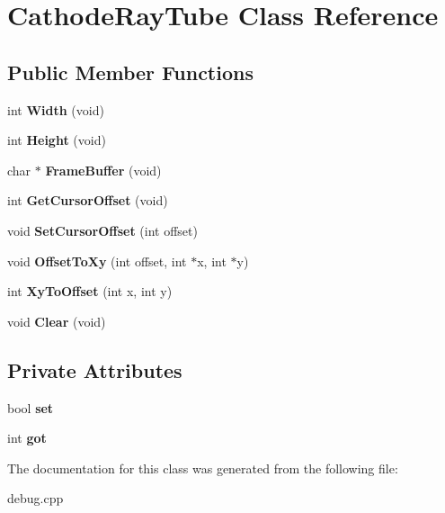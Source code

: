 \hypertarget{class_cathode_ray_tube}{}\section{Cathode\+Ray\+Tube Class Reference}
\label{class_cathode_ray_tube}
\subsection*{Public Member Functions}
\begin{DoxyCompactItemize}
\item 
\mbox{\label{class_cathode_ray_tube_a1ee9fdda3c9182cc88969f882240239e}} 
int {\bfseries Width} (void)
\item 
\mbox{\label{class_cathode_ray_tube_add4a92d30872710612c7c6b145e1bd2e}} 
int {\bfseries Height} (void)
\item 
\mbox{\label{class_cathode_ray_tube_a8c635a7d588bdee1e89803bce01fb570}} 
char $\ast$ {\bfseries Frame\+Buffer} (void)
\item 
\mbox{\label{class_cathode_ray_tube_ac34d60890ce753329ef85511b88de24d}} 
int {\bfseries Get\+Cursor\+Offset} (void)
\item 
\mbox{\label{class_cathode_ray_tube_a98baf39ba4fecd2b2371a7b56e877346}} 
void {\bfseries Set\+Cursor\+Offset} (int offset)
\item 
\mbox{\label{class_cathode_ray_tube_a03ab2f1fef56e75b52054ed9a23e876e}} 
void {\bfseries Offset\+To\+Xy} (int offset, int $\ast$x, int $\ast$y)
\item 
\mbox{\label{class_cathode_ray_tube_a9bb9750db449655a7489c4b60054ff81}} 
int {\bfseries Xy\+To\+Offset} (int x, int y)
\item 
\mbox{\label{class_cathode_ray_tube_aa36a3798fafe70d85512d128b66b41ad}} 
void {\bfseries Clear} (void)
\end{DoxyCompactItemize}
\subsection*{Private Attributes}
\begin{DoxyCompactItemize}
\item 
\mbox{\label{class_cathode_ray_tube_a79c218fbba6ff113b25546c0ca856f73}} 
bool {\bfseries set}
\item 
\mbox{\label{class_cathode_ray_tube_a533c9335b714b27033b5a206b0b5949e}} 
int {\bfseries got}
\end{DoxyCompactItemize}


The documentation for this class was generated from the following file\+:\begin{DoxyCompactItemize}
\item 
debug.\+cpp\end{DoxyCompactItemize}
